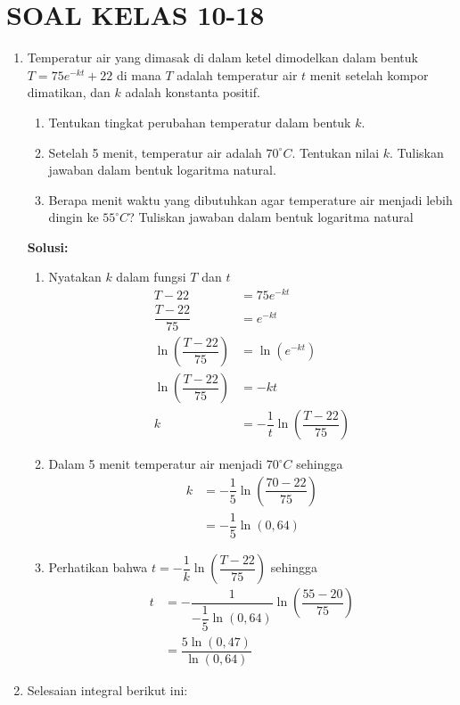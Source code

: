 \documentclass{article}
\begin{document}
\section*{SOAL KELAS 10-18}
\begin{enumerate}
	\item Temperatur air yang dimasak di dalam ketel dimodelkan dalam bentuk $T=75e^{-kt}+22$ di mana $T$ adalah temperatur air $t$ menit setelah kompor dimatikan, dan $k$ adalah konstanta positif.
	\begin{enumerate}
		\item Tentukan tingkat perubahan temperatur dalam bentuk $k$.
		\item Setelah 5 menit, temperatur air adalah $70^\circ C$. Tentukan nilai $k$. Tuliskan jawaban dalam bentuk logaritma natural.
		\item Berapa menit waktu yang dibutuhkan agar temperature air menjadi lebih dingin ke $55^\circ C$? Tuliskan jawaban dalam bentuk logaritma natural
	\end{enumerate}
	\textbf{Solusi:}
	\begin{enumerate}
		\item Nyatakan $k$ dalam fungsi $T$ dan $t$
		\begin{align*}
		T-22 &= 75e^{-kt}\\
		\dfrac{T-22}{75} &= e^{-kt}\\
		\ln\left(\dfrac{T-22}{75}\right) &= \ln(e^{-kt})\\
		\ln\left(\dfrac{T-22}{75}\right) &= -kt\\
		k &= -\dfrac{1}{t}\ln\left(\dfrac{T-22}{75}\right)
		\end{align*}
		\item Dalam 5 menit temperatur air menjadi $70^\circ C$ sehingga
		\begin{align*}
		k &= -\dfrac{1}{5}\ln\left(\dfrac{70-22}{75}\right) \\
		&= -\dfrac{1}{5}\ln(0,64)
		\end{align*}
		\item Perhatikan bahwa $t=-\dfrac{1}{k}\ln\left(\dfrac{T-22}{75}\right)$ sehingga
		\begin{align*}
		t &= -\dfrac{1}{-\dfrac{1}{5}\ln(0,64)}\ln\left(\dfrac{55-20}{75}\right)\\
		&= \dfrac{5\ln(0,47)}{\ln(0,64)}
		\end{align*}
	\end{enumerate}
	\newpage
	\item Selesaian integral berikut ini:
	\begin{enumerate}

\end{enumerate}
\end{enumerate}
\end{document}
